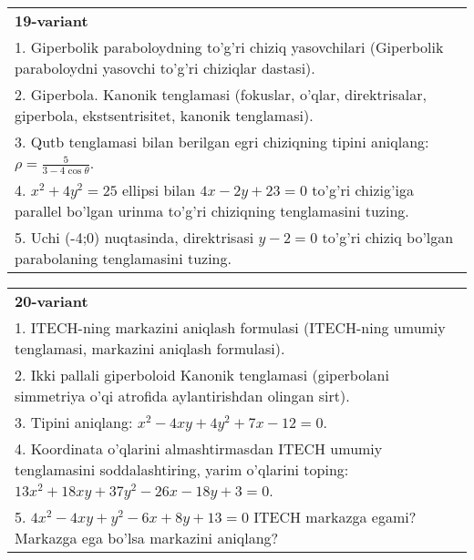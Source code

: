 \documentclass{article}
\begin{document}
\begin{tabular}{m{17cm}}
\textbf{19-variant}\\
1. Giperbolik paraboloydning to'g'ri chiziq yasovchilari (Giperbolik paraboloydni yasovchi to'g'ri chiziqlar dastasi).\\

2. Giperbola. Kanonik tenglamasi (fokuslar, o'qlar, direktrisalar, giperbola, ekstsentrisitet, kanonik tenglamasi).\\

3. Qutb tenglamasi bilan berilgan egri chiziqning tipini aniqlang: $\rho=\frac{5}{3-4\cos\theta}$.\\

4. $x^{2} + 4y^{2} = 25$ ellipsi bilan $4x - 2y + 23 = 0$ to'g'ri chizig'iga parallel bo'lgan urinma to'g'ri chiziqning tenglamasini tuzing.  \\

5. Uchi (-4;0) nuqtasinda, direktrisasi $y - 2 = 0$ to'g'ri chiziq bo'lgan parabolaning tenglamasini tuzing.
\end{tabular}
\vspace{1cm}


\begin{tabular}{m{17cm}}
\textbf{20-variant}\\
1. ITECH-ning markazini aniqlash formulasi (ITECH-ning umumiy tenglamasi, markazini aniqlash formulasi).\\

2. Ikki pallali giperboloid Kanonik tenglamasi (giperbolani simmetriya o'qi atrofida aylantirishdan olingan sirt).\\

3. Tipini aniqlang: $x^{2}-4xy+4y^{2}+7x-12=0$.\\

4. Koordinata o'qlarini almashtirmasdan ITECH umumiy tenglamasini soddalashtiring, yarim o'qlarini toping: $13x^{2} + 18xy + 37y^{2} - 26x - 18y + 3 = 0$.  \\

5. $4x^{2} - 4xy + y^{2} - 6x + 8y + 13 = 0$ ITECH markazga egami? Markazga ega bo'lsa markazini aniqlang?  
\end{tabular}
\vspace{1cm}
\end{document}
